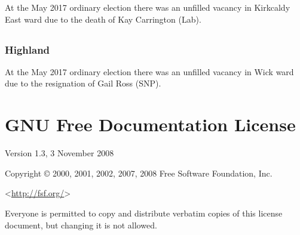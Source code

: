 \documentclass[a4paper,openany]{book}
\begin{document}
\begin{resultsiii}
At the May 2017 ordinary election there was an unfilled vacancy in Kirkcaldy East ward due to the death of Kay Carrington (Lab).

\section[Highland Councils]{}

\subsection*{Highland}

At the May 2017 ordinary election there was an unfilled vacancy in Wick ward due to the resignation of Gail Ross (SNP).

\end{resultsiii}

\clearpage
{}
{\scriptsize%
\frenchspacing\printindex}
\thispagestyle{plain}

\chapter*{{GNU Free Documentation License}}
\pagestyle{plain}

 Version 1.3, 3 November 2008


 Copyright \copyright{} 2000, 2001, 2002, 2007, 2008 Free Software Foundation, Inc.
 
 \bigskip
 
 <\url{http://fsf.org/}>
 
 \bigskip
 
 Everyone is permitted to copy and distribute verbatim copies
 of this license document, but changing it is not allowed.
\end{document}
